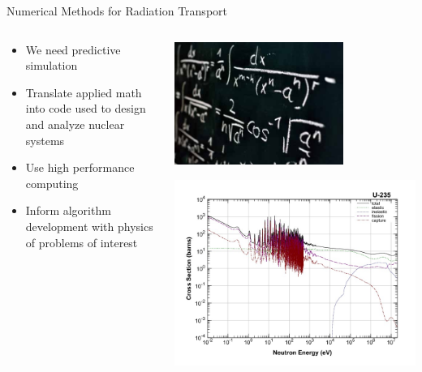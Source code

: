 \documentclass{beamer}
\begin{document}
\begin{frame}{Numerical Methods for Radiation Transport}
%
\begin{columns}
\begin{column}{0.5\textwidth}
\begin{itemize}
\item{We need predictive simulation}
\item{Translate applied math into code used to design and analyze nuclear systems}
\item{Use high performance computing}
\item{Inform algorithm development with physics of problems of interest}
\end{itemize}
\end{column}
\begin{column}{0.5\textwidth}
\center
\includegraphics[width=0.7\textwidth,natwidth=465,natheight=340]{img/applied-math.jpg}

\includegraphics[width=\textwidth,natwidth=792,natheight=612]{img/u235-xsecs.jpg}
\end{column}
\end{columns}
%
\end{frame}
\end{document}
